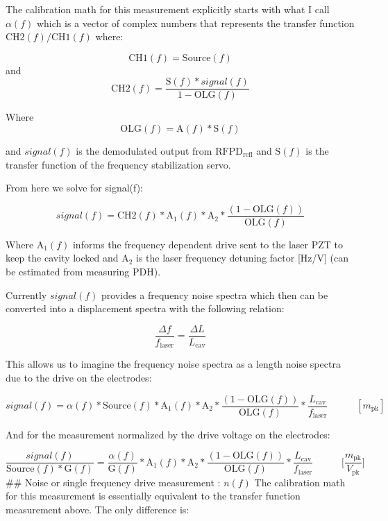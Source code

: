 The calibration math for this measurement explicitly starts with what I
call \(\alpha(f)\) which is a vector of complex numbers that represents
the transfer function \(\mathrm{CH2}(f)/\mathrm{CH1}(f)\) where:

\[\mathrm{CH1}(f) = \mathrm{Source}(f)\] and
\[\mathrm{CH2}(f) = \frac{\mathrm{S}(f)* signal(f)}{1-\mathrm{OLG}(f)}\]

Where \[\mathrm{OLG}(f) = \mathrm{A}(f)* \mathrm{S}(f)\]

and \(signal(f)\) is the demodulated output from
\(\mathrm{RFPD}_\mathrm{refl}\) and \(\mathrm{S}(f)\) is the transfer
function of the frequency stabilization servo.

From here we solve for signal(f):

\[signal(f) = \mathrm{CH2}(f) * \mathrm{A}_{1}(f) * \mathrm{A}_2* \frac{(1-\mathrm{OLG}(f))}{\mathrm{OLG}(f)}\]

Where \(\mathrm{A}_{1}(f)\) informs the frequency dependent drive sent
to the laser PZT to keep the cavity locked and \(\mathrm{A}_2\) is the
laser frequency detuning factor {[}Hz/V{]} (can be estimated from
measuring PDH).

Currently \(signal(f)\) provides a frequency noise spectra which then
can be converted into a displacement spectra with the following
relation:

\[\frac{\Delta f}{f_\mathrm{laser}} = \frac{\Delta L}{L_\mathrm{cav}}\]

This allows us to imagine the frequency noise spectra as a length noise
spectra due to the drive on the electrodes:

\[signal(f) = \alpha(f)* \mathrm{Source}(f) * \mathrm{A}_{1}(f) * \mathrm{A}_2* \frac{(1-\mathrm{OLG}(f))}{\mathrm{OLG}(f)} * \frac{L_\mathrm{cav}}{f_\mathrm{laser}}\hspace{35pt} [m_\mathrm{pk}]\]

And for the measurement normalized by the drive voltage on the
electrodes:

\[\frac{signal(f)}{\mathrm{Source}(f) * \mathrm{G}(f)} = \frac{\alpha(f)}{\mathrm{G}(f)} * \mathrm{A}_{1}(f) * \mathrm{A}_2* \frac{(1-\mathrm{OLG}(f))}{\mathrm{OLG}(f)} * \frac{L_\mathrm{cav}}{f_\mathrm{laser}}\hspace{35pt} \bigg[\frac{m_\mathrm{pk}}{V_\mathrm{pk}}\bigg]\]
\#\# Noise or single frequency drive measurement : \(n(f)\) The
calibration math for this measurement is essentially equivalent to the
transfer function measurement above. The only difference is:

